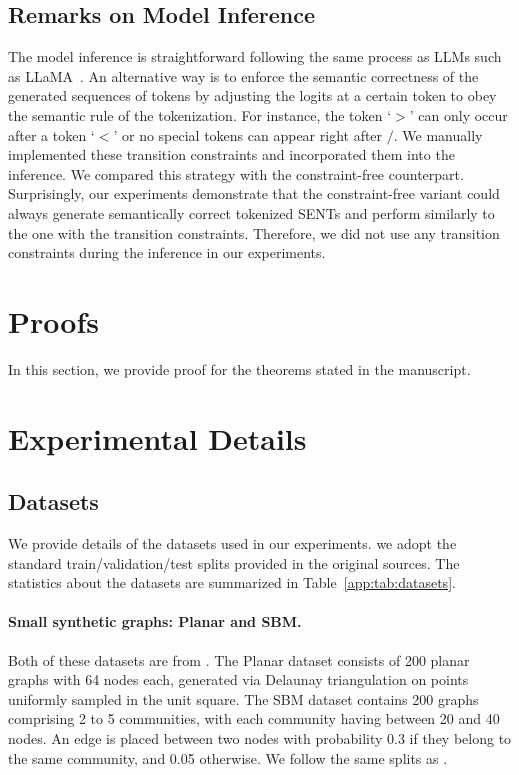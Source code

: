 \subsection{Remarks on Model Inference}
The model inference is straightforward following the same process as LLMs such as LLaMA~\citep{touvron2023llama,touvron2023llama2}. An alternative way is to enforce the semantic correctness of the generated sequences of tokens by adjusting the logits at a certain token to obey the semantic rule of the tokenization. For instance, the token `$\bm{>}$' can only occur after a token `$\bm{<}$' or no special tokens can appear right after $\textbf{/}$. We manually implemented these transition constraints and incorporated them into the inference. We compared this strategy with the constraint-free counterpart. Surprisingly, our experiments demonstrate that the constraint-free variant could always generate semantically correct tokenized SENTs and perform similarly to the one with the transition constraints. Therefore, we did not use any transition constraints during the inference in our experiments.

\section{Proofs}\label{app:sec:proofs}
In this section, we provide proof for the theorems stated in the manuscript.
\printProofs

\section{Experimental Details}\label{app:sec:experimental_details}

\subsection{Datasets}
We provide details of the datasets used in our experiments. we adopt the standard train/validation/test splits provided in the original sources. The statistics about the datasets are summarized in Table~\ref{app:tab:datasets}.

\paragraph{Small synthetic graphs: Planar and SBM.}
Both of these datasets are from \citet{martinkus2022spectre}. The Planar dataset consists of 200 planar graphs with 64 nodes each, generated via Delaunay triangulation on points uniformly sampled in the unit square. The SBM dataset contains 200 graphs comprising 2 to 5 communities, with each community having between 20 and 40 nodes. An edge is placed between two nodes with probability 0.3 if they belong to the same community, and 0.05 otherwise. We follow the same splits as \citet{martinkus2022spectre}.

